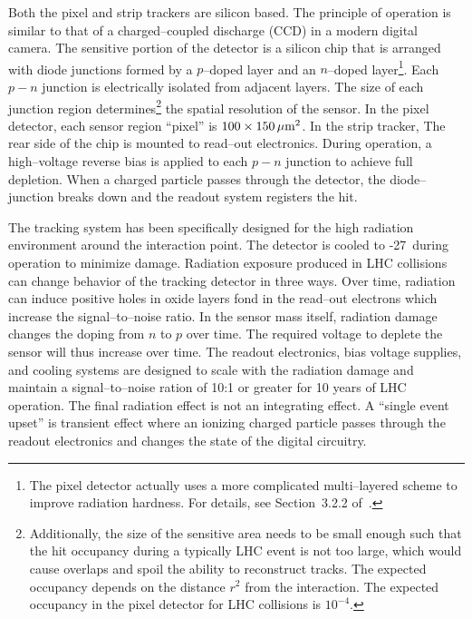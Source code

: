 Both the pixel and strip trackers are silicon based.  The principle of operation
is similar to that of a charged--coupled discharge (CCD) 
in a modern digital camera.  The sensitive portion of the detector is a silicon
chip that is arranged with diode junctions formed by a $p$--doped layer and an
$n$--doped layer\footnote{The pixel detector actually uses a more complicated
multi--layered scheme to improve radiation hardness.  For details, see
Section~3.2.2 of~\cite{CMSExperiment}.}.  Each $p-n$ junction is electrically
isolated from adjacent layers. The size of each junction region
determines\footnote{Additionally, the size of the sensitive area needs to be
small enough such that the hit occupancy during a typically LHC event is not too
large, which would cause overlaps and spoil the ability to reconstruct tracks.
The expected occupancy depends on the distance $r^2$ from the interaction.  The
expected occupancy in the pixel detector for LHC collisions is $10^{-4}$.} the
spatial resolution of the sensor.  In the pixel detector, each sensor region
``pixel'' is $100 \times 150 \,\mu\text{m}^2$.  In the strip tracker, The rear side of
the chip is mounted to read--out electronics.  During operation, a high--voltage
reverse bias is applied to each $p-n$ junction to achieve full depletion.  When
a charged particle passes through the detector, the diode--junction breaks down
and the readout system registers the hit.

The tracking system has been specifically designed for the high radiation
environment around the interaction point.  The detector is cooled to
-27\celsius~during operation to minimize damage. Radiation exposure produced in
LHC collisions can change behavior of the tracking detector in three ways.  Over
time, radiation can induce positive holes in oxide layers fond in the read--out
electrons which increase the signal--to--noise ratio.  In the sensor mass
itself, radiation damage changes the doping from $n$ to $p$ over time.  The
required voltage to deplete the sensor will thus increase over time.  The
readout electronics, bias voltage supplies, and cooling systems are designed to
scale with the radiation damage and maintain a signal--to--noise ration of 10:1
or greater for 10 years of LHC operation.  The final radiation effect is not an
integrating effect.  A ``single event upset'' is transient effect where an
ionizing charged particle passes through the readout electronics and changes the
state of the digital circuitry.  


